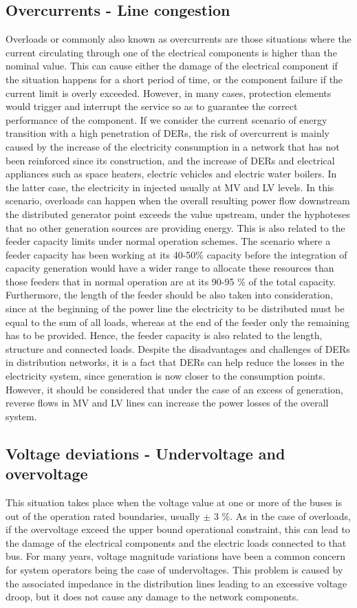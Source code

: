 \subsection{Overcurrents - Line congestion}
Overloads or commonly also known as overcurrents are those situations where the current circulating through one of the electrical components is higher than the nominal value. This can cause either the damage of the electrical component if the situation happens for a short period of time, or the component failure if the current limit is overly exceeded. However, in many cases, protection elements would trigger and interrupt the service so as to guarantee the correct performance of the component. 
If we consider the current scenario of energy transition with a high penetration of DERs, the risk of overcurrent is mainly caused by the increase of the electricity consumption in a network that has not been reinforced since its construction, and the increase of DERs and electrical appliances such as space heaters, electric vehicles and electric water boilers. In the latter case, the electricity in injected usually at MV and LV levels. In this scenario, overloads can happen when the overall resulting power flow downstream the distributed generator point exceeds the value upstream, under the hyphoteses that no other generation sources are providing energy. This is also related to the feeder capacity limits under normal operation schemes. The scenario where a feeder capacity has been working at its 40-50\% capacity before the integration of capacity generation would have a wider range to allocate these resources than those feeders that in normal operation are at its 90-95 \% of the total capacity. Furthermore, the length of the feeder should be also taken into consideration, since at the beginning of the power line the electricity to be distributed must be equal to the sum of all loads, whereas at the end of the feeder only the remaining has to be provided. Hence, the feeder capacity is also related to the length, structure and connected loads. 
Despite the disadvantages and challenges of DERs in distribution networks, it is a fact that DERs can help reduce the losses in the electricity system, since generation is now closer to the consumption points. However, it should be considered that under the case of an excess of generation, reverse flows in MV and LV lines can increase the power losses of the overall system. 

\subsection{Voltage deviations - Undervoltage and overvoltage}
This situation takes place when the voltage value at one or more of the buses is out of the operation rated boundaries, usually $\pm$ 3 \%. As in the case of overloads, if the overvoltage exceed the upper bound operational constraint, this can lead to the damage of the electrical components and the electric loads connected to that bus. 
For many years, voltage magnitude variations have been a common concern for system operators being the case of undervoltages. This problem is caused by the associated impedance in the distribution lines leading to an excessive voltage droop, but it does not cause any damage to the network components.  

